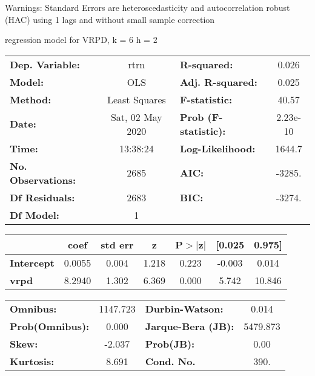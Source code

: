 Warnings: \newline
 [1] Standard Errors are heteroscedasticity and autocorrelation robust (HAC) using 1 lags and without small sample correction\ 

regression model for VRPD, k = 6 h = 2\begin{center}
\begin{tabular}{lclc}
\toprule
\textbf{Dep. Variable:}    &       rtrn       & \textbf{  R-squared:         } &     0.026   \\
\textbf{Model:}            &       OLS        & \textbf{  Adj. R-squared:    } &     0.025   \\
\textbf{Method:}           &  Least Squares   & \textbf{  F-statistic:       } &     40.57   \\
\textbf{Date:}             & Sat, 02 May 2020 & \textbf{  Prob (F-statistic):} &  2.23e-10   \\
\textbf{Time:}             &     13:38:24     & \textbf{  Log-Likelihood:    } &    1644.7   \\
\textbf{No. Observations:} &        2685      & \textbf{  AIC:               } &    -3285.   \\
\textbf{Df Residuals:}     &        2683      & \textbf{  BIC:               } &    -3274.   \\
\textbf{Df Model:}         &           1      & \textbf{                     } &             \\
\bottomrule
\end{tabular}
\begin{tabular}{lcccccc}
                   & \textbf{coef} & \textbf{std err} & \textbf{z} & \textbf{P$> |$z$|$} & \textbf{[0.025} & \textbf{0.975]}  \\
\midrule
\textbf{Intercept} &       0.0055  &        0.004     &     1.218  &         0.223        &       -0.003    &        0.014     \\
\textbf{vrpd}      &       8.2940  &        1.302     &     6.369  &         0.000        &        5.742    &       10.846     \\
\bottomrule
\end{tabular}
\begin{tabular}{lclc}
\textbf{Omnibus:}       & 1147.723 & \textbf{  Durbin-Watson:     } &    0.014  \\
\textbf{Prob(Omnibus):} &   0.000  & \textbf{  Jarque-Bera (JB):  } & 5479.873  \\
\textbf{Skew:}          &  -2.037  & \textbf{  Prob(JB):          } &     0.00  \\
\textbf{Kurtosis:}      &   8.691  & \textbf{  Cond. No.          } &     390.  \\
\bottomrule
\end{tabular}
\end{center}

